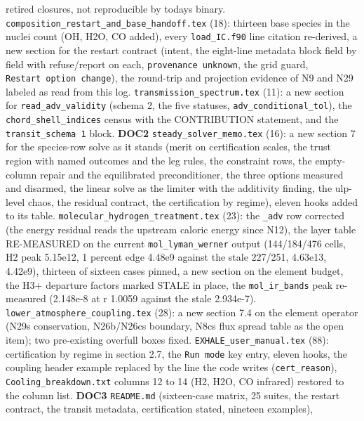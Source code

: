 \documentclass[english,a4paper]{my_memo}
\begin{document}
\begin{itemize}
  retired closure\textquotesingle s, not reproducible by today\textquotesingle s binary.
  \texttt{composition\_restart\_and\_base\_handoff.tex} (18): thirteen base species in
  the nuclei count (OH, H2O, CO added), every \texttt{load\_IC.f90} line citation
  re-derived, a new section for the restart contract (intent, the eight-line
  metadata block field by field with refuse/report on each, \texttt{provenance\ unknown}, the grid guard, \texttt{Restart\ option\ change}), the round-trip and
  projection evidence of N9 and N29 labeled as read from this log.
  \texttt{transmission\_spectrum.tex} (11): a new section for \texttt{read\_adv\_validity}
  (schema 2, the five statuses, \texttt{adv\_conditional\_tol}), the
  \texttt{chord\_shell\_indices} census with the CONTRIBUTION statement, and the
  \texttt{transit\_schema\ 1} block. \textbf{DOC2} \texttt{steady\_solver\_memo.tex} (16): a new
  section 7 for the species-row solve as it stands (merit on certification
  scales, the trust region with named outcomes and the leg rules, the
  constraint rows, the empty-column repair and the equilibrated
  preconditioner, the three options measured and disarmed, the linear solve as
  the limiter with the additivity finding, the ulp-level chaos, the residual
  contract, the certification by regime), eleven hooks added to its table.
  \texttt{molecular\_hydrogen\_treatment.tex} (23): the \texttt{\_adv} row corrected (the
  energy residual reads the upstream caloric energy since N12), the layer
  table RE-MEASURED on the current \texttt{mol\_lyman\_werner} output (144/184/476
  cells, H2 peak 5.15e12, 1 percent edge 4.48e9 against the stale 227/251,
  4.63e13, 4.42e9), thirteen of sixteen cases pinned, a new section on the
  element budget, the H3+ departure factors marked STALE in place, the
  \texttt{mol\_ir\_bands} peak re-measured (2.148e-8 at r 1.0059 against the stale
  2.934e-7). \texttt{lower\_atmosphere\_coupling.tex} (28): a new section 7.4 on the
  element operator (N29\textquotesingle s conservation, N26b/N26c\textquotesingle s boundary, N8c\textquotesingle s flux
  spread table as the open item); two pre-existing overfull boxes fixed.
  \texttt{EXHALE\_user\_manual.tex} (88): certification by regime in section 2.7, the
  \texttt{Run\ mode} key entry, eleven hooks, the coupling header example replaced by
  the line the code writes (\texttt{cert\_reason}), \texttt{Cooling\_breakdown.txt} columns
  12 to 14 (H2, H2O, CO infrared) restored to the column list. \textbf{DOC3}
  \texttt{README.md} (sixteen-case matrix, 25 suites, the restart contract, the
  transit metadata, certification stated, nineteen examples),

\end{itemize}
\end{document}
